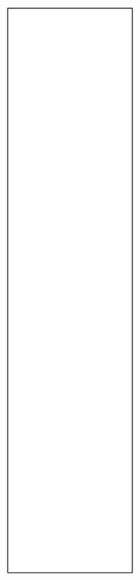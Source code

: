 \begin{minipage}[t]{504pt}
\begin{minipage}[t]{350pt}
\end{minipage}
\hspace{13pt}\begin{minipage}[t]{140pt}
\begin{figure}[H]
\includegraphics[width=140pt]{pic/p1.pdf}
\end{figure}
\end{minipage}
\end{minipage}



